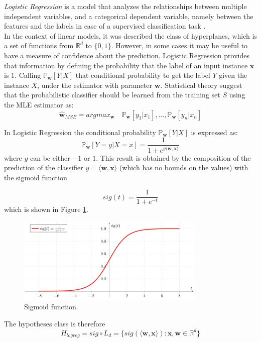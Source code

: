 \textit{Logistic Regression} is a model that analyzes the relationships between multiple independent variables, and a categorical dependent variable, namely between the features and the labels in case of a supervised classification task \cite{article-logreg}.\\
In the context of linear models, it was described the class of hyperplanes, which is a set of functions from $\mathbb{R}^d$ to $\{0,1\}$. However, in some cases it may be useful to have a measure of confidence about the prediction. Logistic Regression provides that information by defining the probability that the label of an input instance $\mathbf{x}$ is $1$. Calling $\mathbb{P}_\mathbf{w}[Y | X]$ that conditional probability to get the label $Y$ given the instance $X$, under the estimator with parameter $\mathbf{w}$. Statistical theory suggest that the probabilistic classifier should be learned from the training set $S$ using the MLE estimator as:
\[ \hat{\mathbf{w}}_{MSE} = argmax_\mathbf{w} \quad \mathbb{P}_\mathbf{w}[y_1 | x_1], \dots , \mathbb{P}_\mathbf{w}[y_n | x_n] \]

In Logistic Regression the conditional probability $\mathbb{P}_\mathbf{w}[Y | X]$ is expressed as:
\[ \mathbb{P}_\mathbf{w}[Y=y | X=x] = \frac{1}{1 + e^{y \langle \mathbf{w}, \mathbf{x} \rangle}} \]
where $y$ can be either $-1$ or $1$. This result is obtained by the composition of the prediction of the classifier $y = \langle \mathbf{w}, \mathbf{x} \rangle$ (which has no bounds on the values) with the sigmoid function

\[ sig(t) = \frac{1}{1 + e^{-t}} \]
which is shown in Figure \ref{fig:sigmoid}.

\begin{figure}[ht]
	\centering
	\includegraphics[width=0.8\textwidth]{figures/sigmoid.png}
	\caption{Sigmoid function.}
	\label{fig:sigmoid}
\end{figure}

The hypotheses class is therefore
\[ H_{logreg} = sig \circ L_d = \{ sig(\langle \mathbf{w}, \mathbf{x} \rangle) : \mathbf{x}, \mathbf{w} \in \mathbb{R}^d \} \]

